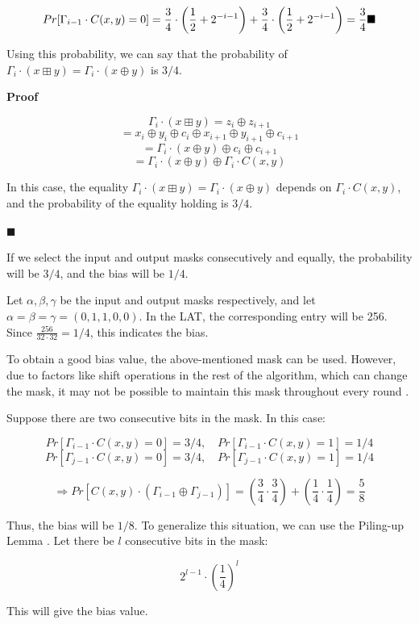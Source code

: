 \documentclass[runningheads]{llncs}
\begin{document}
\[
Pr[\Gamma_{i-1} \cdot C(x,y) = 0] = \frac{3}{4} \cdot \left(\frac{1}{2} + 2^{-i-1}\right) + \frac{3}{4} \cdot \left(\frac{1}{2} + 2^{-i-1}\right) = \frac{3}{4}
\hfill \blacksquare
\]

\vspace{0.2in}

Using this probability, we can say that the probability of $\Gamma_i \cdot (x \boxplus y) = \Gamma_i \cdot (x \oplus y)$ is $3/4$.

\textbf{Proof}

\[
\Gamma_i \cdot (x \boxplus y) = z_i \oplus z_{i+1}
\]
\[
= x_i \oplus y_i \oplus c_i \oplus x_{i+1} \oplus y_{i+1} \oplus c_{i+1}
\]
\[
= \Gamma_i \cdot (x \oplus y) \oplus c_i \oplus c_{i+1}
\]
\[
= \Gamma_i \cdot (x \oplus y) \oplus \Gamma_i \cdot C(x,y)
\]

In this case, the equality $\Gamma_i \cdot (x \boxplus y) = \Gamma_i \cdot (x \oplus y)$ depends on $\Gamma_i \cdot C(x,y)$, and the probability of the equality holding is $3/4$.

\hfill $\blacksquare$

If we select the input and output masks consecutively and equally, the probability will be $3/4$, and the bias will be $1/4$.

\vspace{0.1in}

\begin{example}
    Let $\alpha, \beta, \gamma$ be the input and output masks respectively, and let $\alpha = \beta = \gamma = (0,1,1,0,0)$. In the LAT, the corresponding entry will be 256. Since $\frac{256}{32 \cdot 32} = 1/4$, this indicates the bias.

    To obtain a good bias value, the above-mentioned mask can be used. However, due to factors like shift operations in the rest of the algorithm, which can change the mask, it may not be possible to maintain this mask throughout every round \cite{ashur2016linear}.
    
    \vspace{0.2in}
    
    Suppose there are two consecutive bits in the mask. In this case:
    
    \[
    Pr[\Gamma_{i-1} \cdot C(x,y) = 0] = 3/4, \quad Pr[\Gamma_{i-1} \cdot C(x,y) = 1] = 1/4
    \]
    \[
    Pr[\Gamma_{j-1} \cdot C(x,y) = 0] = 3/4, \quad Pr[\Gamma_{j-1} \cdot C(x,y) = 1] = 1/4
    \]
    
    \vspace{0.1in}
    
    \[
    \Rightarrow Pr[C(x,y)\cdot(\Gamma_{i-1} \oplus \Gamma_{j-1})] = \left(\frac{3}{4} \cdot \frac{3}{4}\right) + \left(\frac{1}{4} \cdot \frac{1}{4}\right) = \frac{5}{8}
    \]
    
    Thus, the bias will be $1/8$. To generalize this situation, we can use the Piling-up Lemma \cite{matsui1993linear}. Let there be $l$ consecutive bits in the mask:
    
    \[
    2^{l-1} \cdot \left(\frac{1}{4}\right)^l
    \]
    
    This will give the bias value.
    

\end{example}
\end{document}
